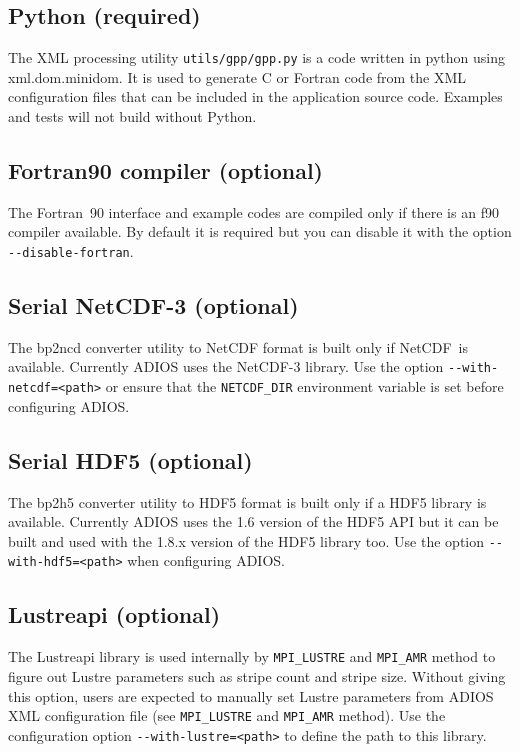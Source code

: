 \subsection{Python (required)}

The XML processing utility \verb+utils/gpp/gpp.py+ is a code written in python using xml.dom.minidom. 
It is used to generate C or Fortran code from the XML configuration files that 
can be included in the application source code.  Examples and tests will not build 
without Python. 

\subsection{Fortran90 compiler (optional)}

The Fortran~90 interface and example codes are compiled only if there is an f90 
compiler available. By default it is required but you can disable it with the option 
\verb+--disable-fortran+.

\subsection{Serial NetCDF-3 (optional)}

The bp2ncd converter utility to NetCDF format is built only if NetCDF~is available. 
 Currently ADIOS uses the NetCDF-3 library. Use the option \verb+--with-netcdf=<path>+ 
or ensure that the \verb+NETCDF_DIR+ environment variable is set before configuring ADIOS.

\subsection{Serial HDF5 (optional)}

The bp2h5 converter utility to HDF5 format is built only if a HDF5 library is available. 
Currently ADIOS uses the 1.6 version of the HDF5 API but it can be built and used 
with the 1.8.x version of the HDF5 library too. Use the option \verb+--with-hdf5=<path>+ 
when configuring ADIOS.

\subsection{Lustreapi (optional)}

The Lustreapi library is used internally by \verb+MPI_LUSTRE+ and \verb+MPI_AMR+ method to 
figure out Lustre parameters such as stripe count and stripe size.  Without giving 
this option, users are expected to manually set Lustre parameters from ADIOS XML 
configuration file (see \verb+MPI_LUSTRE+ and \verb+MPI_AMR+ method). 
Use the configuration option
\verb+--with-lustre=<path>+ to define the path to this library.

